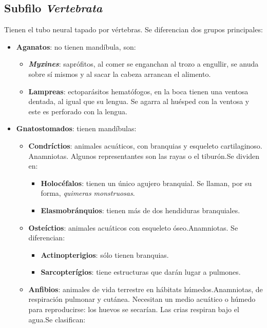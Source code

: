 \subsection{Subfilo \textit{Vertebrata}}
Tienen el tubo neural tapado por vértebras. Se diferencian dos grupos principales:
\begin{itemize}[itemsep=0pt,parsep=0pt,topsep=0pt,partopsep=0pt]
    \item \textbf{Aganatos}: no tienen mandíbula, son:
    \begin{itemize}[itemsep=0pt,parsep=0pt,topsep=0pt,partopsep=0pt]
        \item \textbf{\textit{Myxines}}: saprófitos, al comer se enganchan al trozo a engullir, se anuda sobre sí mismos y al sacar la cabeza arrancan el alimento.
        \item\textbf{Lampreas}: ectoparásitos hematófogos, en la boca tienen una ventosa dentada, al igual que su lengua. Se agarra al huésped con la ventosa y este es perforado con la lengua.
    \end{itemize}
    \item\textbf{Gnatostomados}: tienen mandíbulas:
    \begin{itemize}[itemsep=0pt,parsep=0pt,topsep=0pt,partopsep=0pt]
        \item \textbf{Condríctios}: animales acuáticos, con branquias y esqueleto cartilaginoso. Anamniotas. Algunos representantes son las rayas o el tiburón.Se dividen en:
        \begin{itemize}[itemsep=0pt,parsep=0pt,topsep=0pt,partopsep=0pt]
            \item \textbf{Holocéfalos}: tienen un único agujero branquial. Se llaman, por su forma, \textit{quimeras monstruosas}.
            \item\textbf{Elasmobránquios}: tienen más de dos hendiduras branquiales.
        \end{itemize}
        \item\textbf{Osteíctios}: animales acuáticos con esqueleto óseo.Anamniotas. Se diferencian:
        \begin{itemize}[itemsep=0pt,parsep=0pt,topsep=0pt,partopsep=0pt]
            \item \textbf{Actinopterigios}: sólo tienen branquias.
            \item\textbf{Sarcopterígios}: tiene estructuras que darán lugar a pulmones.
        \end{itemize}
        \item\textbf{Anfibios}: animales de vida terrestre en hábitats húmedos.Anamniotas, de respiración pulmonar y cutánea. Necesitan un medio acuático o húmedo para reproducirse: los huevos se secarían. Las crias respiran bajo el agua.Se clasifican:

\end{itemize}
\end{itemize}
